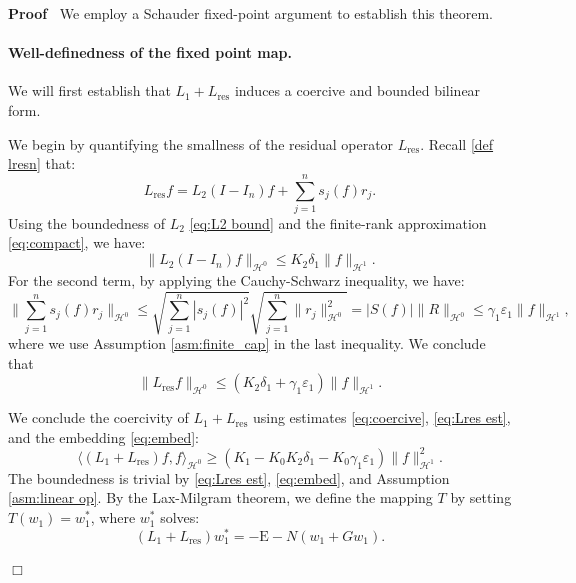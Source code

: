 \documentclass[11pt,a4paper]{article}
\numberwithin{equation}{section}
\newcommand{\Epsilon}{\mathrm{E}}
\newcommand{\tmop}[1]{\ensuremath{\operatorname{#1}}}
\newenvironment{proof}{\noindent\textbf{Proof\ }}{\hspace*{\fill}$\Box$\medskip}
\begin{document}
\begin{proof}
  We employ a Schauder fixed-point argument to establish this theorem.
  
  \paragraph{Well-definedness of the fixed point map.} We will first establish that  $L_1 + L_{\tmop{res}}$ induces a coercive and bounded bilinear form.

  
  
  We begin by quantifying the smallness of the residual operator $L_{\tmop{res}}$. Recall \eqref{def lresn} that:
  \[ L_{\tmop{res}} f = L_2 (I - I_n) f + \sum_{j = 1}^n
     s_j (f) r_j. \]
  Using the boundedness of $L_2$ \eqref{eq:L2 bound} and the finite-rank approximation \eqref{eq:compact}, we have:
  \begin{equation*}
    \| L_2 (I - I_n) f\|_{\mathcal{H}^0} 
    \leqslant K_2 \delta_1 \| f \|_{\mathcal{H}^1} .
  \end{equation*}
  For the second term, by applying the Cauchy-Schwarz inequality, we have:
  \[
    \| \sum_{j = 1}^n s_j (f) r_j\|_{\mathcal{H}^0} 
     \leqslant  \sqrt{\sum_{j = 1}^n | s_j (f) |^2} \sqrt{\sum_{j
    = 1}^n \| r_j \|_{\mathcal{H}^0}^2 }= | S (f) | \| R \|_{\mathcal{H}^0}\leqslant \gamma_1 \varepsilon_1 \| f
    \|_{\mathcal{H}^1} ,
  \]
  where we use Assumption \ref{asm:finite_cap} in the last inequality.
  We conclude that\begin{equation}
      \label{eq:Lres est}\| L_{\tmop{res}}f\|_{\mathcal{H}^0}\leqslant (K_2 \delta_1 +\gamma_1 \varepsilon_1) \| f
    \|_{\mathcal{H}^1}.
  \end{equation}

We conclude the coercivity of $L_1 + L_{\tmop{res}}$ using estimates \eqref{eq:coercive}, \eqref{eq:Lres est}, and the embedding \eqref{eq:embed}:
  \begin{equation}
    \langle (L_1 + L_{\tmop{res}}) f, f \rangle_{\mathcal{H}^0} \geqslant (K_1 - K_0 K_2 \delta_1  - K_0 \gamma_1  \varepsilon_1)\| f \|_{\mathcal{H}^1}^2. \label{eq:LHS est}
  \end{equation}
  The boundedness is trivial by \eqref{eq:Lres est}, \eqref{eq:embed}, and Assumption \ref{asm:linear op}. By the Lax-Milgram theorem, we define the mapping $T$ by
  setting $T (w_1)=w_1^{\ast}$, where $w_1^{\ast}$ solves:
  \begin{equation}
    (L_1 + L_{\tmop{res}}) w_1^{\ast} = -\Epsilon - N (w_1 + G w_1) .
    \label{eq:Tmap eq}
  \end{equation}


\end{proof}
\end{document}
